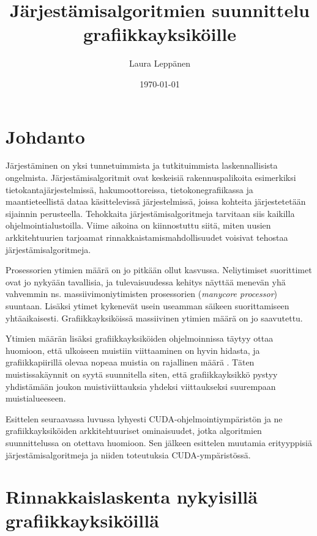 \documentclass[a4paper,11pt]{article}
\newcommand{\engl}[1]{\foreignlanguage{english}{\em #1}}
\begin{document}
\title{Järjestämisalgoritmien suunnittelu grafiikkayksiköille}
\author{Laura Leppänen}
\date{\today}
\maketitle
\thispagestyle{empty}

\tableofcontents
\onehalfspacing

\newpage
\setcounter{page}{1}

\section{Johdanto}

Järjestäminen on yksi tunnetuimmista ja tutkituimmista laskennallisista ongelmista. Järjestämisalgoritmit ovat keskeisiä rakennuspalikoita esimerkiksi tietokantajärjestelmissä, hakumoottoreissa, tietokonegrafiikassa ja maantieteellistä dataa käsittelevissä järjestelmissä, joissa kohteita järjestetetään sijainnin perusteella. Tehokkaita järjestämisalgoritmeja tarvitaan siis kaikilla ohjelmointialustoilla. Viime aikoina on kiinnostuttu siitä, miten uusien arkkitehtuurien tarjoamat rinnakkaistamismahdollisuudet voisivat tehostaa järjestämisalgoritmeja.

Prosessorien ytimien määrä on jo pitkään ollut kasvussa. Neliytimiset suorittimet ovat jo nykyään tavallisia, ja tulevaisuudessa kehitys näyttää menevän yhä vahvemmin ns. massiivimoniytimisten prosessorien (\engl{manycore processor}) suuntaan. Lisäksi ytimet kykenevät usein useamman säikeen suorittamiseen yhtäaikaisesti. Grafiikkayksiköissä massiivinen ytimien määrä on jo saavutettu.

Ytimien määrän lisäksi grafiikkayksiköiden ohjelmoinnissa täytyy ottaa huomioon, että ulkoiseen muistiin viittaaminen on hyvin hidasta, ja grafiikkapiirillä olevaa nopeaa muistia on rajallinen määrä \cite{leischner2010}. Täten muistissakäynnit on syytä suunnitella siten, että grafiikkayksikkö pystyy yhdistämään joukon muistiviittauksia yhdeksi viittaukseksi suurempaan muistialueeseen.

Esittelen seuraavassa luvussa lyhyesti CUDA-ohjelmointiympäristön ja ne grafiikkayksiköiden arkkitehtuuriset ominaisuudet, jotka algoritmien suunnittelussa on otettava huomioon. Sen jälkeen esittelen muutamia erityyppisiä järjestämisalgoritmeja ja niiden toteutuksia CUDA-ympäristössä.

\section{Rinnakkaislaskenta nykyisillä grafiikkayksiköillä}
\end{document}
